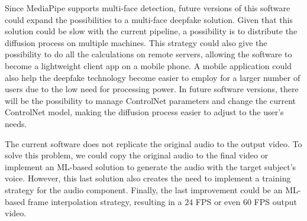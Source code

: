 \documentclass[preprint]{elsarticle}
\begin{document}
Since MediaPipe supports multi-face detection, future versions of this software could expand the possibilities to a multi-face deepfake solution. Given that this solution could be slow with the current pipeline, a possibility is to distribute the diffusion process on multiple machines. This strategy could also give the possibility to do all the calculations on remote servers, allowing the software to become a lightweight client app on a mobile phone. A mobile application could also help the deepfake technology become easier to employ for a larger number of users due to the low need for processing power. In future software versions, there will be the possibility to manage ControlNet parameters and change the current ControlNet model, making the diffusion process easier to adjust to the user's needs.

The current software does not replicate the original audio to the output video. To solve this problem, we could copy the original audio to the final video or implement an ML-based solution to generate the audio with the target subject's voice. However, this last solution also creates the need to implement a training strategy for the audio component. Finally, the last improvement could be an ML-based frame interpolation strategy, resulting in a $24$ FPS or even $60$ FPS output video.



  

\end{document}
